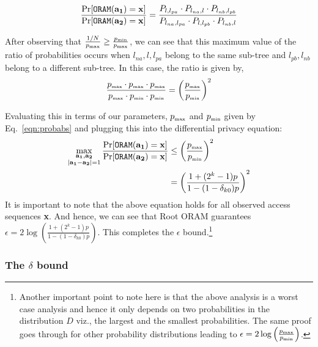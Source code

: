 \documentclass[USenglish,oneside,twocolumn]{article}
\newcommand{\ourprotocol}{Root ORAM}
\begin{document}
\[
\frac{\Pr [{\tt ORAM}(\mathbf{a_1}) = \mathbf{x}]}{\Pr [{\tt ORAM}(\mathbf{a_2}) = \mathbf{x}]} = \frac{P_{l,l_{pa}} \cdot P_{l_{na},l} \cdot P_{l_{nb},l_{pb}}}{P_{l_{na},l_{pa}} \cdot P_{l,l_{pb}} \cdot P_{l_{nb},l}}
\]


After observing that $\frac{1/N}{p_{{\tiny \mbox{max}}}} \geq \frac{p_{{\tiny \mbox{min}}}}{p_{{\tiny \mbox{max}}}}$, we can see that this maximum value of the ratio of probabilities occurs when $l_{na}, l, l_{pa}$ belong to the same sub-tree and $l_{pb}, l_{nb}$ belong to a different sub-tree. In this case, the ratio is given by,
\[
\frac{p_{{\tiny \mbox{max}}} \cdot p_{{\tiny \mbox{max}}} \cdot p_{{\tiny \mbox{max}}}}{p_{{\tiny \mbox{max}}} \cdot p_{{\tiny \mbox{min}}} \cdot p_{{\tiny \mbox{min}}}} = \left( \frac{p_{{\tiny \mbox{max}}}}{p_{{\tiny \mbox{min}}}} \right)^2
\]

Evaluating this in terms of our parameters, $p_{{\tiny \mbox{max}}}$ and $p_{{\tiny \mbox{min}}}$ given by Eq.~\ref{eqn:probabs} and plugging this into the differential privacy equation:
\begin{align*}
  \max_{\substack{\mathbf{a_1,a_2}\\ |\mathbf{a_1 - a_2}| = 1}} \frac{\Pr [{\tt ORAM}(\mathbf{a_1}) = \mathbf{x}]}{\Pr [{\tt ORAM}(\mathbf{a_2}) = \mathbf{x}]}  & \leq \left( \frac{p_{{\tiny \mbox{max}}}}{p_{{\tiny \mbox{min}}}} \right)^2 \\
  & = \left( \frac{1+(2^k - 1)p}{1- (1-\delta_{k0}) p} \right)^2
\end{align*}  
It is important to note that the above equation holds for all observed access sequences \textbf{x}. And hence, we can see that \ourprotocol{} guarantees $\epsilon = 2 \log \left( \frac{1+(2^k - 1)p}{1- (1-\delta_{k0}) p} \right)$. This completes the $\epsilon$ bound.\footnote{Another important point to note here is that the above analysis is a worst case analysis and hence it only depends on two probabilities in the distribution $D$ viz., the largest and the smallest probabilities. The same proof goes through for other probability distributions leading to $\epsilon = 2 \log \left( \frac{p_{{\tiny \mbox{max}}}}{p_{{\tiny \mbox{min}}}} \right)$.} 


\vspace{-2em}
\subsubsection{\textbf{The $\delta$ bound}}\label{attack}
\vspace{-1em}
\end{document}
